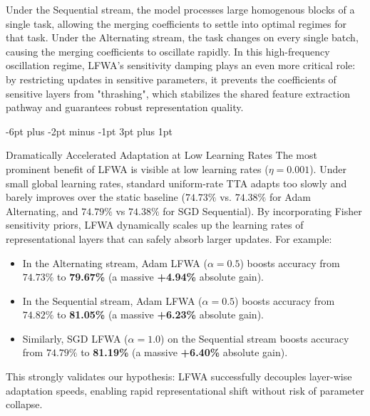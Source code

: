 \documentclass{article}
\makeatletter
\theoremstyle{plain}
\theoremstyle{definition}
\theoremstyle{remark}
\renewcommand{\subsection}{\@startsection{subsection}{2}{\z@}%
                          {-6pt plus -2pt minus -1pt}%
                          {3pt plus 1pt}%
                          {\normalfont\normalsize\bfseries\raggedright}}
\makeatother
\begin{document}
Under the Sequential stream, the model processes large homogenous blocks of a single task, allowing the merging coefficients to settle into optimal regimes for that task. Under the Alternating stream, the task changes on every single batch, causing the merging coefficients to oscillate rapidly. In this high-frequency oscillation regime, LFWA's sensitivity damping plays an even more critical role: by restricting updates in sensitive parameters, it prevents the coefficients of sensitive layers from "thrashing", which stabilizes the shared feature extraction pathway and guarantees robust representation quality.

\subsection{Dramatically Accelerated Adaptation at Low Learning Rates}
The most prominent benefit of LFWA is visible at low learning rates ($\eta = 0.001$). Under small global learning rates, standard uniform-rate TTA adapts too slowly and barely improves over the static baseline ($74.73\%$ vs. $74.38\%$ for Adam Alternating, and $74.79\%$ vs $74.38\%$ for SGD Sequential). 
By incorporating Fisher sensitivity priors, LFWA dynamically scales up the learning rates of representational layers that can safely absorb larger updates. For example:
\begin{itemize}\setlength{\itemsep}{1pt}\setlength{\parskip}{0pt}\setlength{\parsep}{0pt}
    \item In the Alternating stream, Adam LFWA ($\alpha=0.5$) boosts accuracy from $74.73\%$ to \textbf{79.67\%} (a massive \textbf{+4.94\%} absolute gain).
    \item In the Sequential stream, Adam LFWA ($\alpha=0.5$) boosts accuracy from $74.82\%$ to \textbf{81.05\%} (a massive \textbf{+6.23\%} absolute gain).
    \item Similarly, SGD LFWA ($\alpha=1.0$) on the Sequential stream boosts accuracy from $74.79\%$ to \textbf{81.19\%} (a massive \textbf{+6.40\%} absolute gain).
\end{itemize}
This strongly validates our hypothesis: LFWA successfully decouples layer-wise adaptation speeds, enabling rapid representational shift without risk of parameter collapse.
\end{document}
